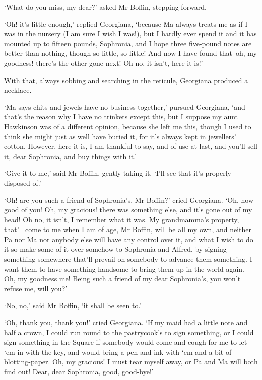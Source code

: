 ‘What do you miss, my dear?’ asked Mr Boffin, stepping forward.

‘Oh! it’s little enough,’ replied Georgiana, ‘because Ma always treats
me as if I was in the nursery (I am sure I wish I was!), but I hardly
ever spend it and it has mounted up to fifteen pounds, Sophronia, and I
hope three five-pound notes are better than nothing, though so little,
so little! And now I have found that--oh, my goodness! there’s the other
gone next! Oh no, it isn’t, here it is!’

With that, always sobbing and searching in the reticule, Georgiana
produced a necklace.

‘Ma says chits and jewels have no business together,’ pursued Georgiana,
‘and that’s the reason why I have no trinkets except this, but I suppose
my aunt Hawkinson was of a different opinion, because she left me this,
though I used to think she might just as well have buried it, for it’s
always kept in jewellers’ cotton. However, here it is, I am thankful
to say, and of use at last, and you’ll sell it, dear Sophronia, and buy
things with it.’

‘Give it to me,’ said Mr Boffin, gently taking it. ‘I’ll see that it’s
properly disposed of.’

‘Oh! are you such a friend of Sophronia’s, Mr Boffin?’ cried Georgiana.
‘Oh, how good of you! Oh, my gracious! there was something else, and
it’s gone out of my head! Oh no, it isn’t, I remember what it was. My
grandmamma’s property, that’ll come to me when I am of age, Mr Boffin,
will be all my own, and neither Pa nor Ma nor anybody else will have
any control over it, and what I wish to do it so make some of it over
somehow to Sophronia and Alfred, by signing something somewhere that’ll
prevail on somebody to advance them something. I want them to have
something handsome to bring them up in the world again. Oh, my goodness
me! Being such a friend of my dear Sophronia’s, you won’t refuse me,
will you?’

‘No, no,’ said Mr Boffin, ‘it shall be seen to.’

‘Oh, thank you, thank you!’ cried Georgiana. ‘If my maid had a little
note and half a crown, I could run round to the pastrycook’s to sign
something, or I could sign something in the Square if somebody would
come and cough for me to let ‘em in with the key, and would bring a pen
and ink with ‘em and a bit of blotting-paper. Oh, my gracious! I must
tear myself away, or Pa and Ma will both find out! Dear, dear Sophronia,
good, good-bye!’

